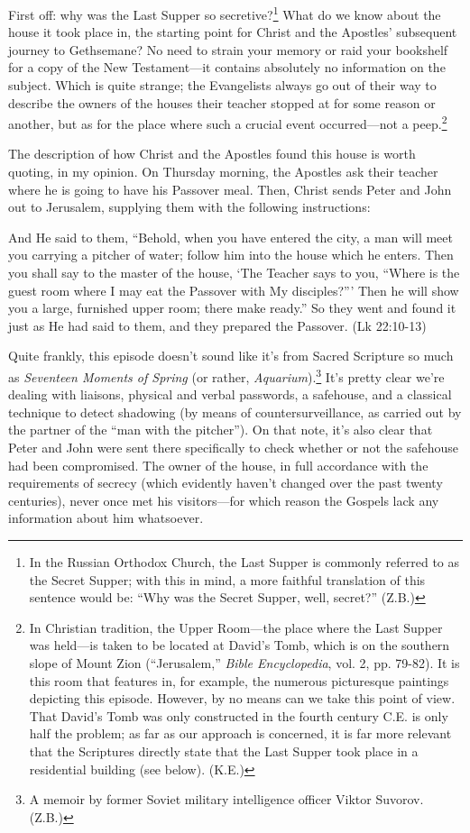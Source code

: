 First off: why was the Last Supper so secretive?\footnote{In the Russian Orthodox Church, the Last Supper is commonly referred to as the Secret Supper; with this in mind, a more faithful translation of this sentence would be: ``Why was the Secret Supper, well, secret?'' (Z.B.)} What do we know about the house it took place in, the starting point for Christ and the Apostles' subsequent journey to Gethsemane? No need to strain your memory or raid your bookshelf for a copy of the New Testament---it contains absolutely no information on the subject. Which is quite strange; the Evangelists always go out of their way to describe the owners of the houses their teacher stopped at for some reason or another, but as for the place where such a crucial event occurred---not a peep.\footnote{In Christian tradition, the Upper Room---the place where the Last Supper was held---is taken to be located at David's Tomb, which is on the southern slope of Mount Zion (``Jerusalem,'' \emph{Bible Encyclopedia}, vol. 2, pp. 79-82). It is this room that features in, for example, the numerous picturesque paintings depicting this episode. However, by no means can we take this point of view. That David's Tomb was only constructed in the fourth century C.E. is only half the problem; as far as our approach is concerned, it is far more relevant that the Scriptures directly state that the Last Supper took place in a residential building (see below). (K.E.)}

The description of how Christ and the Apostles found this house is worth quoting, in my opinion. On Thursday morning, the Apostles ask their teacher where he is going to have his Passover meal. Then, Christ sends Peter and John out to Jerusalem, supplying them with the following instructions:

\begin{smallquote}
    And He said to them, ``Behold, when you have entered the city, a man will meet you carrying a pitcher of water; follow him into the house which he enters. Then you shall say to the master of the house, `The Teacher says to you, ``Where is the guest room where I may eat the Passover with My disciples?''' Then he will show you a large, furnished upper room; there make ready.'' So they went and found it just as He had said to them, and they prepared the Passover. (Lk 22:10-13)
\end{smallquote}
Quite frankly, this episode doesn't sound like it's from Sacred Scripture so much as \emph{Seventeen Moments of Spring} (or rather, \emph{Aquarium}).\footnote{A memoir by former Soviet military intelligence officer Viktor Suvorov. (Z.B.)} It's pretty clear we're dealing with liaisons, physical and verbal passwords, a safehouse, and a classical technique to detect shadowing (by means of countersurveillance, as carried out by the partner of the ``man with the pitcher''). On that note, it's also clear that Peter and John were sent there specifically to check whether or not the safehouse had been compromised. The owner of the house, in full accordance with the requirements of secrecy (which evidently haven't changed over the past twenty centuries), never once met his visitors---for which reason the Gospels lack any information about him whatsoever.

